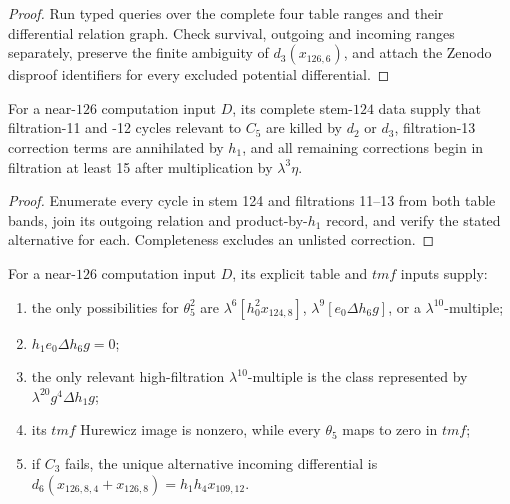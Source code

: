 \begin{proof}
  Run typed queries over the complete four table ranges and their differential
  relation graph.  Check survival, outgoing and incoming ranges separately,
  preserve the finite ambiguity of $d_3(x_{126,6})$, and attach the Zenodo
  disproof identifiers for every excluded potential differential.
\end{proof}

\begin{proposition}
  \label{evidence:near126-indeterminacy}
  \notready
  For a near-$126$ computation input $D$, its complete stem-$124$ data supply
  that filtration-11 and -12 cycles relevant
  to $C_5$ are killed by $d_2$ or $d_3$, filtration-13 correction terms are
  annihilated by $h_1$, and all remaining corrections begin in filtration at
  least 15 after multiplication by $\lambda^3\eta$.
\end{proposition}

\begin{proof}
  Enumerate every cycle in stem 124 and filtrations 11--13 from both table
  bands, join its outgoing relation and product-by-$h_1$ record, and verify the
  stated alternative for each.  Completeness excludes an unlisted correction.
\end{proof}

\begin{proposition}
  \label{evidence:theta5-square-tmf}
  \notready
  For a near-$126$ computation input $D$, its explicit table and $tmf$ inputs
  supply:
  \begin{enumerate}
    \item the only possibilities for $\theta_5^2$ are
      $\lambda^6[h_0^2x_{124,8}]$,
      $\lambda^9[e_0\Delta h_6g]$, or a $\lambda^{10}$-multiple;
    \item $h_1e_0\Delta h_6g=0$;
    \item the only relevant high-filtration $\lambda^{10}$-multiple is the
      class represented by $\lambda^{20}g^4\Delta h_1g$;
    \item its $tmf$ Hurewicz image is nonzero, while every $\theta_5$ maps to
      zero in $tmf$;
    \item if $C_3$ fails, the unique alternative incoming differential is
      $d_6(x_{126,8,4}+x_{126,8})=h_1h_4x_{109,12}$.
  \end{enumerate}
\end{proposition}

